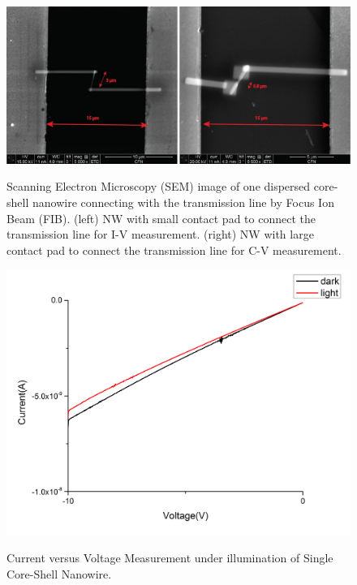 \begin{figure}
  \caption{Scanning Electron Microscopy (SEM) image of one dispersed core-shell nanowire connecting with the transmission line by Focus Ion Beam (FIB). (left) NW with small contact pad to connect the transmission line for I-V measurement. (right) NW with large contact pad to connect the transmission line for C-V measurement.}
  \centering
  \includegraphics[width=\textwidth]{pictures/Data/ContactNW}
  \label{ContactNW}
\end{figure}

\begin{figure}
  \caption{Current versus Voltage Measurement under illumination of Single Core-Shell Nanowire.}
  \centering
  \includegraphics[width=\textwidth]{pictures/Data/CSNWIVlight}
  \label{CSNWIVlight}
\end{figure}

